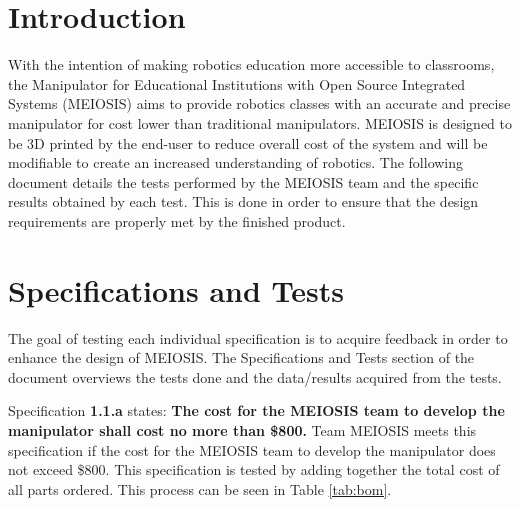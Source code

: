 

\normalem

{\tableofcontents\let\clearpage\relax\listoffigures\listoftables}
\clearpage
\newpage
{}
\raggedright
\section{Introduction}\label{sec:intro}

With the intention of making robotics education more accessible to classrooms, the Manipulator for Educational Institutions with Open Source Integrated Systems (MEIOSIS) aims to provide robotics classes with an accurate and precise manipulator for cost lower than traditional manipulators. MEIOSIS is designed to be 3D printed by the end-user to reduce overall cost of the system and will be modifiable to create an increased understanding of robotics. The following document details the tests performed by the MEIOSIS team and the specific results obtained by each test. This is done in order to ensure that the design requirements are properly met by the finished product.


\section{Specifications and Tests}\label{sec:tests}
The goal of testing each individual specification is to acquire feedback in order to enhance the design of MEIOSIS. The Specifications and Tests section of the document overviews the tests done and the data/results acquired from the tests.

Specification \textbf{1.1.a} states: \textbf{The cost for the MEIOSIS team to develop the manipulator shall cost no more than \$800.} Team MEIOSIS meets this specification if the cost for the MEIOSIS team to develop the manipulator does not exceed \$800. This specification is tested by adding together the total cost of all parts ordered. This process can be seen in Table \ref{tab:bom}.

